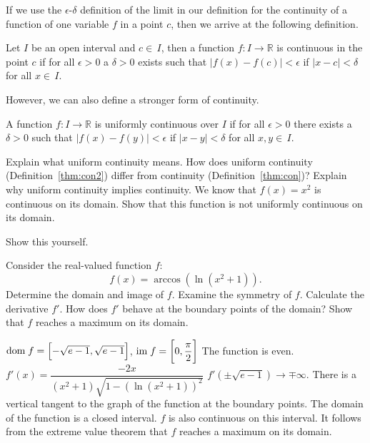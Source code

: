 \begin{Exercise} %
If we use the $\epsilon$-$\delta$ definition of the limit in our definition for the continuity of a function of one variable $f$ in a point $c$, then we arrive at the following definition.

\begin{theorem}\label{thm:con}
Let $I$ be an open interval and $c\in\,I$, then a function $f:I\to\mathbb{R}$ is continuous in the point $c$ if for all $\epsilon>0$ a $\delta>0$ exists such that $|f(x)-f(c)|<\epsilon$ if $|x-c|<\delta$ for all $x\in\,I$.
\end{theorem}

However, we can also define a stronger form of continuity.

\begin{theorem}\label{thm:con2}
A function $f:I\to\mathbb{R}$ is uniformly continuous over $I$ if for all $\epsilon>0$ there exists a $\delta>0$ such that $|f(x)-f(y )|<\epsilon$ if $|x-y|<\delta$ for all $x,y\in\,I$.
\end{theorem}

\Question Explain what uniform continuity means.
\Question How does uniform continuity (Definition~\ref{thm:con2}) differ from continuity (Definition~\ref{thm:con})?
\Question Explain why uniform continuity implies continuity. 
\Question We know that $f(x)=x^2$ is continuous on its domain. Show that this function is not uniformly continuous on its domain.
\EndCurrentQuestion
\end{Exercise} 

\begin{Answer}\phantom{}
Show this yourself.
\end{Answer}

\begin{Exercise} %
Consider the real-valued function $f$:
$$
f(x)=\arccos{\left(\ln\left(x^2+1\right)\right)}.
$$
\Question Determine the domain and image of $f$.
\Question Examine the symmetry of $f$.
\Question Calculate the derivative $f'$. 
\Question How does $f'$ behave at the boundary points of the domain?
\Question Show that $f$ reaches a maximum on its domain.
\EndCurrentQuestion
\end{Exercise} 


\begin{Answer}

\Question $\text{dom}{\;f} = \left[- \sqrt{e-1}, \sqrt{e-1}\right]$, \quad $\text{im}{\;f} = \left[0, \dfrac{\pi}{2}\right]$
\Question The function is even.
\Question $f'(x) = \dfrac{-2x}{\left(x^2+1 \right) \sqrt{1 - \left(\ln(x^2+1)\right)^2}}$
\Question $f'\left( \pm \sqrt{e-1} \right) \rightarrow \mp \infty$. There is a vertical tangent to the graph of the function at the boundary points.
\Question The domain of the function is a closed interval. $f$ is also continuous on this interval. It follows from the extreme value theorem that $f$ reaches a maximum on its domain.

\end{Answer}


